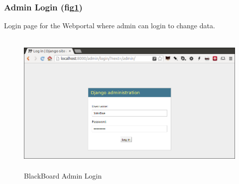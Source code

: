 \documentclass[BTech]{srmuthesis}
\begin{document}
\subsubsection{Admin Login (fig\ref{fig:django-login})}
Login page for the Webportal where admin can login to change data.
\begin{figure}[htbp]
	\centering
	\includegraphics[width=\linewidth, height=7cm,keepaspectratio]{djangologin}
	\caption{BlackBoard Admin Login}
	\label{fig:django-login}
\end{figure} 
\end{document}
